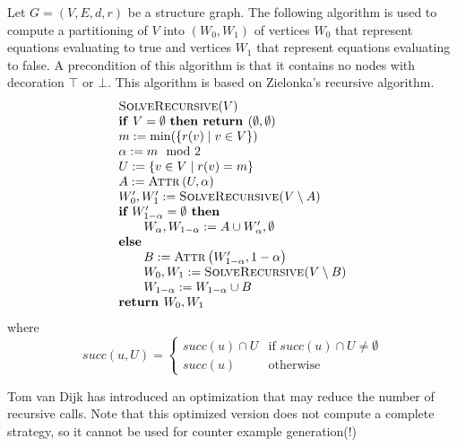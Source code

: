 \documentclass{article}
\begin{document}
Let $G=(V,E,d,r)$ be a structure graph. The following algorithm is used to compute
a partitioning of $V$ into $\left( W_{0},W_{1}\right) $ of vertices $W_{0}$ that
represent equations evaluating to true and vertices $W_{1}$ that represent equations
evaluating to false. A precondition of this algorithm is that it contains no nodes with
decoration $\top $ or $\bot$. This algorithm is based on Zielonka's recursive algorithm.
\begin{equation*}
\begin{array}{l}
\textsc{SolveRecursive}(V) \\ 
\text{\textbf{if} }V=\emptyset \text{ \textbf{then return }}(\emptyset
,\emptyset ) \\ 
m:=\min (\{r(v)\mid v\in V\}) \\ 
\alpha :=m \mod 2 \\ 
U:=\{v\in V\mid r(v)=m\} \\ 
A:=\text{\textsc{Attr}}\left( U,\alpha \right)  \\ 
W_{0}^{\prime },W_{1}^{\prime }:=\text{\textsc{SolveRecursive(}}V\setminus A%
\text{)} \\ 
\textbf{if } W_{1-\alpha }^{\prime }= \emptyset \textbf{ then} \\ 
\qquad W_{\alpha },W_{1-\alpha }:=A\cup W_{\alpha }^{\prime }, \emptyset \\ 
\text{\textbf{else}} \\ 
\qquad B:=\text{\textsc{Attr}}\left( W_{1-\alpha }^{\prime },1-\alpha \right)  \\ 
\qquad W_{0},W_{1}:=\text{\textsc{SolveRecursive(}}V\setminus B\text{)} \\ 
\qquad W_{1-\alpha }:=W_{1-\alpha }\cup B \\ 
\text{\textbf{return }}W_{0},W_{1}%
\end{array}%
\end{equation*}%
where%
\begin{equation*}
succ(u,U)=\left\{ 
\begin{array}{ll}
succ(u)\cap U & \text{if }succ(u)\cap U\neq \emptyset  \\ 
succ(u) & \text{otherwise}%
\end{array}%
\right. 
\end{equation*}

Tom van Dijk has introduced an optimization that may reduce the number of recursive calls. Note that this optimized version does not compute a complete strategy, so it
cannot be used for counter example generation(!)
\end{document}
